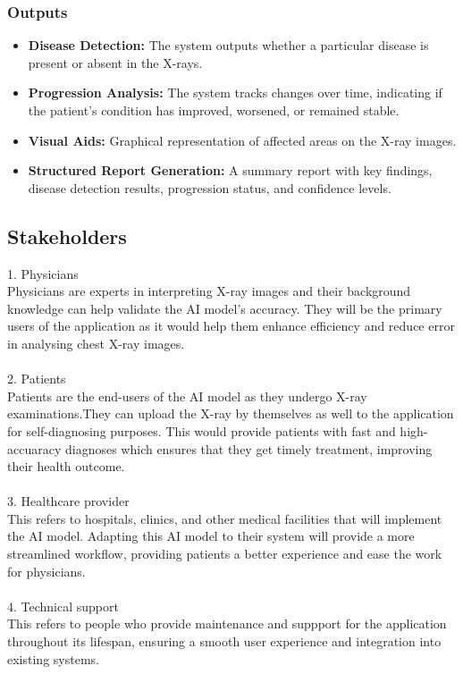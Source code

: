 \documentclass{article}
\begin{document}
\subsubsection{Outputs}

\begin{itemize}
    \item \textbf{Disease Detection:} The system outputs whether a particular disease is present or absent in the X-rays.
    \item \textbf{Progression Analysis:} The system tracks changes over time, indicating if the patient’s condition has improved, worsened, or remained stable.
    \item \textbf{Visual Aids:} Graphical representation of affected areas on the X-ray images.
    \item \textbf{Structured Report Generation:} A summary report with key findings, disease detection results, progression status, and confidence levels.

\end{itemize}



\subsection{Stakeholders}
1. Physicians \\
Physicians are experts in interpreting X-ray images and their background knowledge can help validate the AI model's accuracy. They will be the primary users of the application as it would help them enhance efficiency and reduce error in analysing chest X-ray images. \\
\\
2. Patients\\
Patients are the end-users of the AI model as they undergo X-ray examinations.They can upload the X-ray by themselves as well to the application for self-diagnosing purposes. This would provide patients with fast and high-accuaracy diagnoses which ensures that they get timely treatment, improving their health outcome.\\
\\
3. Healthcare provider\\
This refers to  hospitals, clinics, and other medical facilities that will implement the AI model. Adapting this AI model to their system will provide a more streamlined workflow, providing patients a better experience and ease the work for physicians. \\
\\
4. Technical support\\
This refers to people who provide maintenance and suppport for the application throughout its lifespan, ensuring a smooth user experience and integration into existing systems.
\\
\end{document}
